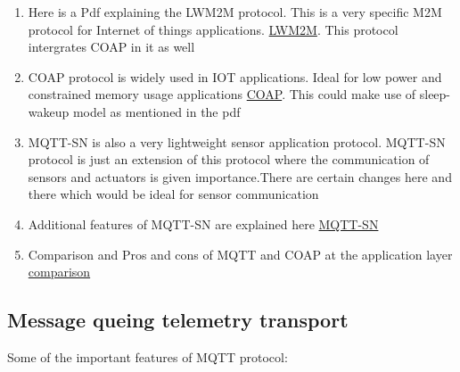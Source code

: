 \documentclass[16pt]{article}
\begin{document}
\begin{enumerate}

\item
  Here is a Pdf explaining the LWM2M protocol. This is a very specific
  M2M protocol for Internet of things
  applications. \href{http://archive.ericsson.net/service/internet/picov/get?DocNo=1/28701-FGB101973}{LWM2M}.
  This protocol intergrates COAP in it as well
\item
  COAP protocol is widely used in IOT applications. Ideal for low power
  and constrained memory usage applications
  \href{https://tools.ietf.org/html/draft-arkko-core-sleepy-sensors-01}{COAP}.
  This could make use of sleep-wakeup model as mentioned in the pdf
\item
  MQTT-SN is also a very lightweight sensor application protocol.
  MQTT-SN protocol is just an extension of this protocol where the
  communication of sensors and actuators is given importance.There are
  certain changes here and there which would be ideal for sensor
  communication
\item
  Additional features of MQTT-SN are explained here
 \href{http://mqtt.org/new/wp-content/uploads/2009/06/MQTT-SN_spec_v1.2.pdf}{MQTT-SN}
\item
  Comparison and Pros and cons of MQTT and COAP at the application layer
  \href{http://www.eclipse.org/community/eclipse_newsletter/2014/february/article2.php}{comparison}
\end{enumerate}

\vspace{0.5cm}

\subsection{Message queing telemetry transport}

\vspace{0.5cm}
Some of the important features of MQTT protocol:
\end{document}
